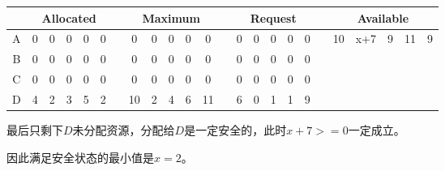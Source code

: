 \begin{solution}
\begin{table}[H]
    \begin{center}
    \begin{tabular}{|c|c|c|c|c|c|c|c|c|c|c|c|c|c|c|c|c|c|c|c|c|c|c|c|}
    \hline
     & \multicolumn{ 5}{c|}{Allocated} &  & \multicolumn{ 5}{c|}{Maximum} &  & \multicolumn{ 5}{c|}{Request} &  & \multicolumn{ 5}{c|}{Available} \\ \hline
    A & 0 & 0 & 0 & 0 & 0 &  & 0 & 0 & 0 & 0 & 0 &  & 0 & 0 & 0 & 0 & 0 &  & 10 & x+7 & 9 & 11 & 9 \\ \hline
    B & 0 & 0 & 0 & 0 & 0 &  & 0 & 0 & 0 & 0 & 0 &  & 0 & 0 & 0 & 0 & 0 &  &  &  &  &  &  \\ \hline
    C & 0 & 0 & 0 & 0 & 0 &  & 0 & 0 & 0 & 0 & 0 &  & 0 & 0 & 0 & 0 & 0 &  &  &  &  &  &  \\ \hline
    D & 4 & 2 & 3 & 5 & 2 &  & 10 & 2 & 4 & 6 & 11 &  & 6 & 0 & 1 & 1 & 9 &  &  &  &  &  &  \\ \hline
    \end{tabular}
    \end{center}
\end{table}

最后只剩下$D$未分配资源，分配给$D$是一定安全的，此时$x+7>=0$一定成立。

因此满足安全状态的最小值是$x=2$。

\end{solution}